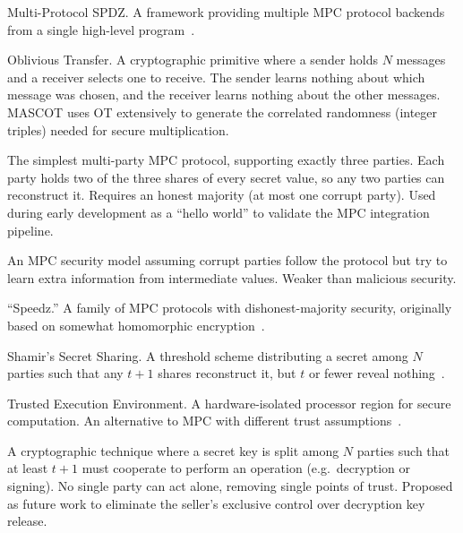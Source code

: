 \begin{description}[style=nextline, labelwidth=5cm, leftmargin=5.5cm]
  \item[MP-SPDZ] Multi-Protocol SPDZ. A framework providing multiple MPC protocol backends from a single high-level program~\cite{mp-spdz}.
  \item[OT] Oblivious Transfer. A cryptographic primitive where a sender holds $N$ messages and a receiver selects one to receive. The sender learns nothing about which message was chosen, and the receiver learns nothing about the other messages. MASCOT uses OT extensively to generate the correlated randomness (integer triples) needed for secure multiplication.
  \item[Replicated secret sharing] The simplest multi-party MPC protocol, supporting exactly three parties. Each party holds two of the three shares of every secret value, so any two parties can reconstruct it. Requires an honest majority (at most one corrupt party). Used during early development as a ``hello world'' to validate the MPC integration pipeline.
  \item[Semi-honest security] An MPC security model assuming corrupt parties follow the protocol but try to learn extra information from intermediate values. Weaker than malicious security.
  \item[SPDZ] ``Speedz.'' A family of MPC protocols with dishonest-majority security, originally based on somewhat homomorphic encryption~\cite{damgaard2011_spdz}.
  \item[SSS] Shamir's Secret Sharing. A threshold scheme distributing a secret among $N$ parties such that any $t{+}1$ shares reconstruct it, but $t$ or fewer reveal nothing~\cite{shamir1979_secret_sharing}.
  \item[TEE] Trusted Execution Environment. A hardware-isolated processor region for secure computation. An alternative to MPC with different trust assumptions~\cite{li2023_secure_comp_tee_survey}.
  \item[Threshold cryptography] A cryptographic technique where a secret key is split among $N$ parties such that at least $t{+}1$ must cooperate to perform an operation (e.g.\ decryption or signing). No single party can act alone, removing single points of trust. Proposed as future work to eliminate the seller's exclusive control over decryption key release.


\end{description}
